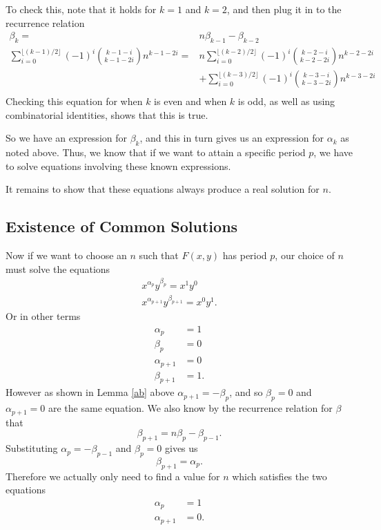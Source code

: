 \documentclass[12pt]{article}
\begin{document}
To check this, note that it holds for $k = 1$ and $k = 2$, and then plug it in to the recurrence relation
\begin{align*}
\beta_k =& n\beta_{k-1} - \beta_{k-2}\\
\sum_{i = 0}^{\lfloor (k-1)/2 \rfloor} (-1)^i\binom{k-1-i}{k-1-2i}n^{k-1-2i} = & n \sum_{i = 0}^{\lfloor (k-2)/2 \rfloor} (-1)^i\binom{k-2-i}{k-2-2i}n^{k-2-2i} \\
& +\sum_{i = 0}^{\lfloor (k-3)/2 \rfloor} (-1)^i\binom{k-3-i}{k-3-2i}n^{k-3-2i}\\
\end{align*}
Checking this equation for when $k$ is even and when $k$ is odd, as well as using combinatorial identities, shows that this is true.

So we have an expression for $\beta_k$, and this in turn gives us an expression for $\alpha_k$ as noted above. Thus, we know that if we want to attain a specific period $p$, we have to solve equations involving these known expressions.

It remains to show that these equations always produce a real solution for $n$.

\subsection{Existence of Common Solutions}

Now if we want to choose an $n$ such that  $F(x,y)$ has period $p$, our choice of $n$ must solve the equations 
\begin{align*}
x^{\alpha_p} y^{\beta_p} = x^{1}y^{0} \\
x^{\alpha_{p+1}} y^{\beta_{p+1}} = x^{0}y^{1}.
\end{align*}
Or in other terms
\begin{align*}
\alpha_p &=1 \\
\beta_p &=0\\ 
\alpha_{p+1} &= 0 \\
\beta_{p+1} &= 1.
\end{align*}
However as shown in Lemma \ref{ab} above $\alpha_{p+1} = -\beta_p$, and so $\beta_p=0$ and $\alpha_{p+1} =0$ are the same equation.  We also know by the recurrence relation for $\beta$ that 
\begin{equation*}
\beta_{p+1} = n \beta_{p} - \beta_{p-1}.
\end{equation*}
Substituting $\alpha_p = -\beta_{p-1}$ and $\beta_{p}=0$ gives us 
\begin{equation*}
\beta_{p+1} = \alpha_p.
\end{equation*} 
Therefore we actually only need to find a value for $n$ which satisfies the two equations
\begin{align*}
\alpha_p &=1\\
\alpha_{p+1}&=0.
\end{align*}
\end{document}
